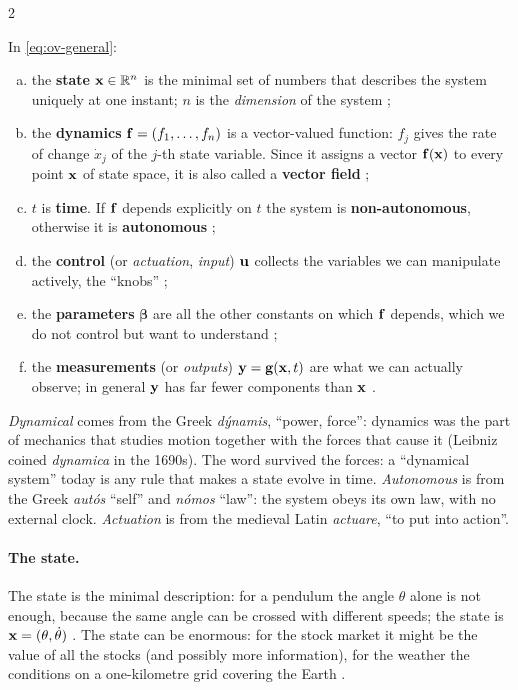 \begin{paracol}{2}
\begin{definition}\label{def:ov-anatomy}
In \eqref{eq:ov-general}:
\begin{enumerate}[(a)]
  \item the \textbf{state} $\mathbf{x}\in\mathbb{R}^n$ is the minimal set of numbers that describes the system
        uniquely at one instant; $n$ is the \emph{dimension} of the system ;
  \item the \textbf{dynamics} $\mathbf{f}=(f_1,\dots,f_n)$ is a vector-valued function: $f_j$ gives the
        rate of change $\dot x_j$ of the $j$-th state variable. Since it assigns a vector
        $\mathbf{f}(\mathbf{x})$ to every point $\mathbf{x}$ of state space, it is also called a \textbf{vector field}
        ;
  \item $t$ is \textbf{time}. If $\mathbf{f}$ depends explicitly on $t$ the system is
        \textbf{non-autonomous}, otherwise it is \textbf{autonomous} ;
  \item the \textbf{control} (or \emph{actuation}, \emph{input}) $\mathbf{u}$ collects the variables we can
        manipulate actively, the ``knobs'' ;
  \item the \textbf{parameters} $\boldsymbol\beta$ are all the other constants on which $\mathbf{f}$
        depends, which we do not control but want to understand ;
  \item the \textbf{measurements} (or \emph{outputs}) $\mathbf{y}=\mathbf{g}(\mathbf{x},t)$ are what we can actually
        observe; in general $\mathbf{y}$ has far fewer components than $\mathbf{x}$ .
\end{enumerate}
\end{definition}

\begin{aside}
\emph{Dynamical} comes from the Greek \emph{dýnamis}, ``power, force'': dynamics was the part of
mechanics that studies motion together with the forces that cause it (Leibniz coined
\emph{dynamica} in the 1690s). The word survived the forces: a ``dynamical system'' today is any rule
that makes a state evolve in time. \emph{Autonomous} is from the Greek \emph{autós} ``self'' and
\emph{nómos} ``law'': the system obeys its own law, with no external clock.
\emph{Actuation} is from the medieval Latin \emph{actuare}, ``to put into action''.
\end{aside}

\paragraph{The state.} The state is the minimal description: for a pendulum the angle $\theta$ alone
is not enough, because the same angle can be crossed with different speeds; the state is
$\mathbf{x}=(\theta,\dot\theta)$ . The state can be enormous: for the stock market it might be
the value of all the stocks (and possibly more information), for the weather the conditions on a
one-kilometre grid covering the Earth .


\end{paracol}
